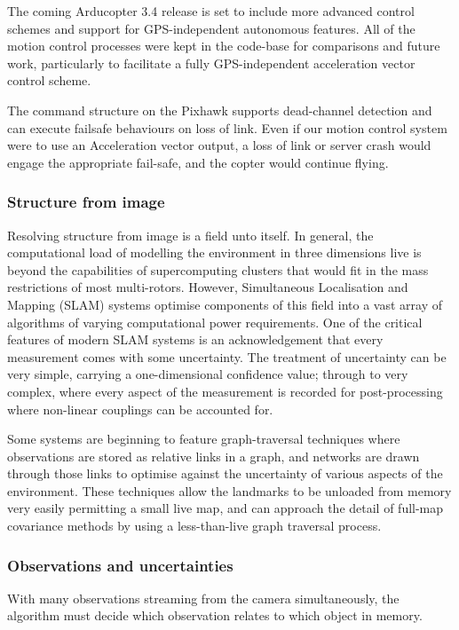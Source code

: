 \documentclass{article}
\newcounter{subsubsubsection}[subsubsection]
\begin{document}
      The coming Arducopter 3.4 release is set to include more advanced control schemes and support for GPS-independent autonomous features.  All of the motion control processes were kept in the code-base for comparisons and future work, particularly to facilitate a fully GPS-independent acceleration vector control scheme.

      The command structure on the Pixhawk supports dead-channel detection and can execute failsafe behaviours on loss of link.  Even if our motion control system were to use an Acceleration vector output, a loss of link or server crash would engage the appropriate fail-safe, and the copter would continue flying.

    \subsubsection{Structure from image}
      Resolving structure from image is a field unto itself.  In general, the computational load of modelling the environment in three dimensions live is beyond the capabilities of supercomputing clusters that would fit in the mass restrictions of most multi-rotors.  However, Simultaneous Localisation and Mapping (SLAM) systems optimise components of this field into a vast array of algorithms of varying computational power requirements.
      One of the critical features of modern SLAM systems is an acknowledgement that every measurement comes with some uncertainty. 
      The treatment of uncertainty can be very simple, carrying a one-dimensional confidence value; through to very complex, where every aspect of the measurement is recorded for post-processing where non-linear couplings can be accounted for.

      Some systems are beginning to feature graph-traversal techniques where observations are stored as relative links in a graph, and networks are drawn through those links to optimise against the uncertainty of various aspects of the environment.  These techniques allow the landmarks to be unloaded from memory very easily permitting a small live map, and can approach the detail of full-map covariance methods by using a less-than-live graph traversal process.

    \subsubsection{Observations and uncertainties}
    \label{sec:ObsAndUnc}
        \label{sec:objectAllocation}
        With many observations streaming from the camera simultaneously, the algorithm must decide which observation relates to which object in memory.
\end{document}
